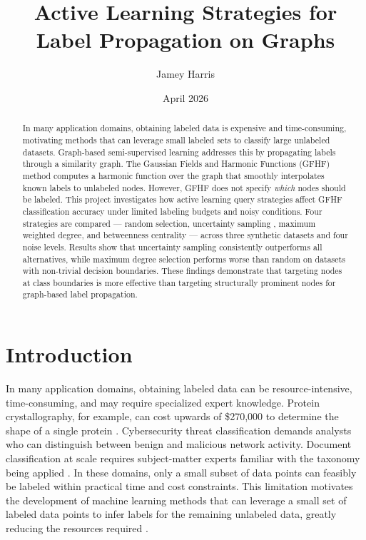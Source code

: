 \documentclass[12pt]{article}
\title{Active Learning Strategies for Label Propagation on Graphs}
\author{Jamey Harris}
\date{April 2026}
\begin{document}
\maketitle

\begin{abstract}
In many application domains, obtaining labeled data is expensive and time-consuming, motivating methods that can leverage small labeled sets to classify large unlabeled datasets. Graph-based semi-supervised learning addresses this by propagating labels through a similarity graph. The Gaussian Fields and Harmonic Functions (GFHF) method \cite{Zhu2003} computes a harmonic function over the graph that smoothly interpolates known labels to unlabeled nodes. However, GFHF does not specify \textit{which} nodes should be labeled. This project investigates how active learning query strategies affect GFHF classification accuracy under limited labeling budgets and noisy conditions. Four strategies are compared --- random selection, uncertainty sampling \cite{Lewis1994}, maximum weighted degree, and betweenness centrality \cite{Freeman1977} --- across three synthetic datasets and four noise levels. Results show that uncertainty sampling consistently outperforms all alternatives, while maximum degree selection performs worse than random on datasets with non-trivial decision boundaries. These findings demonstrate that targeting nodes at class boundaries is more effective than targeting structurally prominent nodes for graph-based label propagation.
\end{abstract}

\section{Introduction}

In many application domains, obtaining labeled data can be resource-intensive, time-consuming, and may require specialized expert knowledge. Protein crystallography, for example, can cost upwards of \$270,000 to determine the shape of a single protein \cite{Zhu2003}. Cybersecurity threat classification demands analysts who can distinguish between benign and malicious network activity. Document classification at scale requires subject-matter experts familiar with the taxonomy being applied \cite{Bilgic2010}. In these domains, only a small subset of data points can feasibly be labeled within practical time and cost constraints. This limitation motivates the development of machine learning methods that can leverage a small set of labeled data points to infer labels for the remaining unlabeled data, greatly reducing the resources required \cite{Chapelle2006}.
\end{document}
